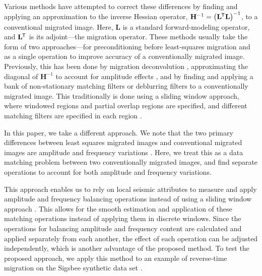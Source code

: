     Various methods have attempted to correct these differences by finding and applying an approximation to the inverse Hessian operator, $\mathbf{H}^{-1} = \left (\mathbf{L}^{\mkern-1.5mu\mathsf{T}}\mathbf{L} \right )^{-1}$, to a conventional migrated image.
    Here, $\mathbf{L}$ is a standard forward-modeling operator, and $\mathbf{L}^{\mkern-1.5mu\mathsf{T}}$ is its adjoint---the migration operator.
    These methods usually take the form of two approaches---for preconditioning before least-squares migration and as a single operation to improve accuracy of a conventionally migrated image.
    Previously, this has been done by migration deconvolution \cite[]{poststack,prestack}, approximating the diagonal of $\mathbf{H}^{-1}$ to account for amplitude effects \cite[]{amp,diagamp}, and by finding and applying a bank of non-stationary matching filters \cite[]{imop,rtmmf} or deblurring filters \cite[]{debfilt} to a conventionally migrated image.
    This traditionally is done using a sliding window approach, where windowed regions and partial overlap regions are specified, and different matching filters are specified in each region \cite[]{seiinv}.

    In this paper, we take a different approach. 
    We note that the two primary differences between least squares migrated images and conventional migrated images are amplitude and frequency variations \cite[]{Hou2015, Hou2016}. 
    Here, we treat this as a data matching problem between two conventionally migrated images, and find separate operations to account for both amplitude and frequency variations.

    This approach enables us to rely on local seismic attributes to measure and apply amplitude and frequency balancing operations instead of using a sliding window approach \cite[]{attr}.
This allows for the smooth estimation and application of these matching operations instead of applying them in discrete windows.
    Since the operations for balancing amplitude and frequency content are calculated and applied separately from each another, the effect of each operation can be adjusted independently, which is another advantage of the proposed method.
    To test the proposed approach, we apply this method to an example of reverse-time migration on the Sigsbee synthetic data set \cite[]{sigsbee}. 

